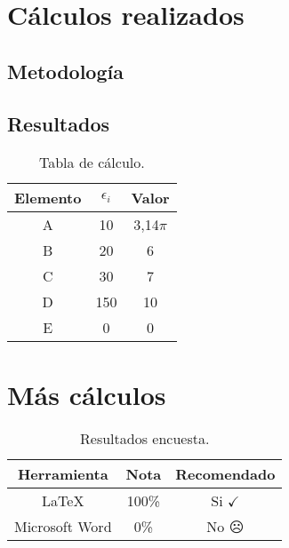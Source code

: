 \newpage
\begin{anexo}

\section{Cálculos realizados}

	\subsection{Metodología}
		\lipsum[1]


	\subsection{Resultados}
		\lipsum[10]

		\enabletablerowcolor[2] %
		\begin{table}[htbp]
			\centering
			\caption{Tabla de cálculo.}
			\begin{tabular}{ccc}
				\hline
				\textbf{Elemento} & $\epsilon_i$ & \boldmath{}\textbf{Valor}\unboldmath{} \bigstrut\\
				\hline
				A     & 10    & 3,14$\pi$ \bigstrut[t]\\
				B     & 20    & 6 \\
				C     & 30    & 7 \\
				D     & 150    & 10 \\
				E     & 0    & 0 \\
				\hline
				\end{tabular}
			\label{tab:anexo-1}
		\end{table}
		\disabletablerowcolor %

\newpage
\section{Más cálculos}

	\lipsum[1]

	\newp \lipsum[4]

	\begin{table}[htbp]
		\centering
		\caption{Resultados encuesta.}
		\begin{tabular}{ccc}
			\hline
			\textbf{Herramienta} & \textbf{Nota} & \textbf{Recomendado} \bigstrut\\
			\hline
			\LaTeX & 100\% & Si $\checkmark$ \\
			Microsoft Word \textsuperscript{\textregistered} & 0\% & No $\frownie$\\
			\hline
		\end{tabular}
		\label{tab:anexo-2}
	\end{table}

\end{anexo}
